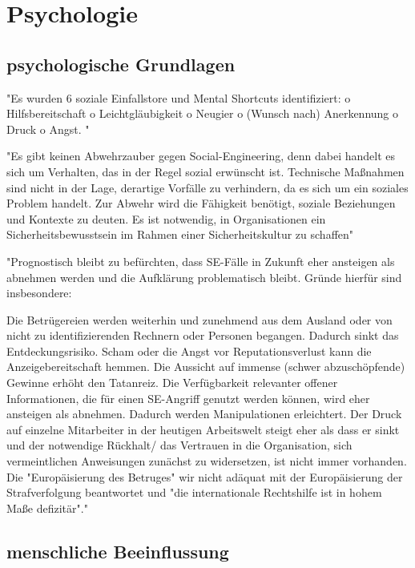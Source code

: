 \chapter{Psychologie}
\label{chapter:psychologie}

\section{psychologische Grundlagen}

"Es wurden 6 soziale Einfallstore und Mental Shortcuts identifiziert:
o Hilfsbereitschaft
o Leichtgläubigkeit
o Neugier
o (Wunsch nach) Anerkennung
o Druck
o Angst.
"\cite{10_bka}

"Es gibt keinen Abwehrzauber gegen Social-Engineering, denn dabei handelt es sich um Verhalten,
das in der Regel sozial erwünscht ist. Technische
Maßnahmen sind nicht in der Lage, derartige Vorfälle zu verhindern, da es
sich um ein soziales Problem handelt. Zur Abwehr wird die Fähigkeit benötigt,
soziale Beziehungen und Kontexte zu deuten. Es ist notwendig, in Organisationen
ein Sicherheitsbewusstsein im Rahmen einer Sicherheitskultur zu schaffen"\cite{10_bka}

"Prognostisch bleibt zu befürchten, dass SE-Fälle in Zukunft eher ansteigen als abnehmen
werden und die Aufklärung problematisch bleibt. Gründe hierfür sind insbesondere:

Die Betrügereien werden weiterhin und zunehmend aus dem Ausland oder von nicht
zu identifizierenden Rechnern oder Personen begangen. Dadurch sinkt das Entdeckungsrisiko.
Scham oder die Angst vor Reputationsverlust kann die Anzeigebereitschaft hemmen.
Die Aussicht auf immense (schwer abzuschöpfende) Gewinne erhöht den Tatanreiz.
Die Verfügbarkeit relevanter offener Informationen, die für einen SE-Angriff genutzt
werden können, wird eher ansteigen als abnehmen. Dadurch werden Manipulationen
erleichtert.
Der Druck auf einzelne Mitarbeiter in der heutigen Arbeitswelt steigt eher als dass er
sinkt und der notwendige Rückhalt/ das Vertrauen in die Organisation, sich vermeintlichen Anweisungen zunächst zu widersetzen, ist nicht immer vorhanden.
Die "Europäisierung des Betruges" wir nicht adäquat mit der Europäisierung der
Strafverfolgung beantwortet und "die internationale Rechtshilfe ist in hohem Maße defizitär"."\cite{10_bka}


\section{menschliche Beeinflussung}

